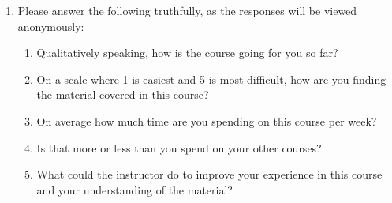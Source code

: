\documentclass[12pt]{article}
\begin{document}
\begin{enumerate}[font=\bfseries]
\begin{enumerate}[label=\theenumi.\arabic*]
    \end{enumerate}
    \item {} Please answer the following truthfully, as the responses will be viewed anonymously:
    \begin{enumerate}[label=\theenumi.\arabic*]
        \item Qualitatively speaking, how is the course going for you so far? \LeaveSpace{}
        \item On a scale where 1 is easiest and 5 is most difficult, how are you finding the material covered in this course?\Blank{}
        \item On average how much time are you spending on this course per week?\Blank{}
        \item Is that more or less than you spend on your other courses?\Blank{}
        \item What could the instructor do to improve your experience in this course and your understanding of the material?
        \LeaveSpace{}
    \end{enumerate}

\end{enumerate}
\end{document}
